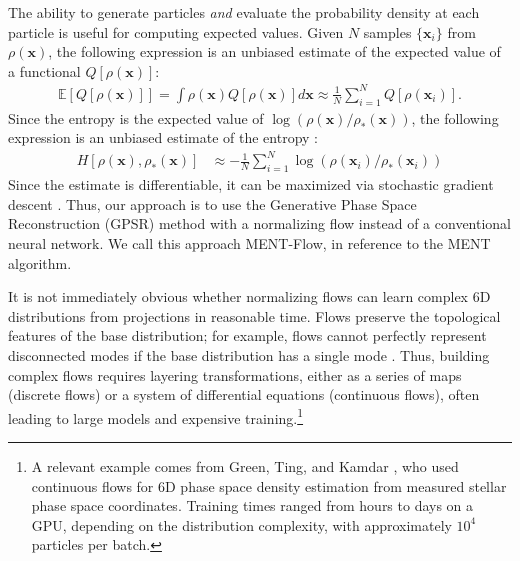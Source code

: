\documentclass[%
    reprint,
    twocolumn,
    nofootinbib,
    amsmath,
    amssymb,
    aps,
    prstab,
]{revtex4-2}
\newcommand{\vect}[1]{\boldsymbol{\mathbf{#1}}}
\begin{document}
The ability to generate particles \textit{and} evaluate the probability density at each particle is useful for computing expected values. Given $N$ samples $\{ \vect{x}_i \}$ from $\rho(\vect{x})$, the following expression is an unbiased estimate of the expected value of a functional $Q[\rho(\vect{x})]$:
%
\begin{equation} \label{eq:monte_carlo}
\begin{aligned}
    \mathbb{E} 
    \left[ Q[\rho(\vect{x})] \right]
    = \int \rho(\vect{x}) Q[\rho(\vect{x})] d\vect{x}
    \approx 
    \frac{1}{N} 
    \sum_{i=1}^{N}  Q[\rho(\vect{x}_i)].
\end{aligned}
\end{equation}
%
Since the entropy is the expected value of $\log ( \rho(\vect{x}) / \rho_*(\vect{x}))$, the following expression is an unbiased estimate of the entropy \cite{Loaiza_2016}:
%
\begin{equation} \label{eq:flow_entropy}
\begin{aligned}
    H[\rho(\vect{x}), \rho_*(\vect{x})]
    &\approx
    -\frac{1}{N} 
    \sum_{i=1}^{N} 
    \log ( \rho(\vect{x}_i) / \rho_*(\vect{x}_i) ) 
\end{aligned}
\end{equation}
%
Since the estimate is differentiable, it can be maximized via stochastic gradient descent \cite{Loaiza_2016}. Thus, our approach is to use the Generative Phase Space Reconstruction (GPSR) method \cite{Roussel_2023} with a normalizing flow instead of a conventional neural network. We call this approach MENT-Flow, in reference to the MENT algorithm.

It is not immediately obvious whether normalizing flows can learn complex 6D distributions from projections in reasonable time. Flows preserve the topological features of the base distribution; for example, flows cannot perfectly represent disconnected modes if the base distribution has a single mode \cite{Stimper_2022}. Thus, building complex flows requires layering transformations, either as a series of maps (discrete flows) or a system of differential equations (continuous flows), often leading to large models and expensive training.\footnote{A relevant example comes from Green, Ting, and Kamdar \cite{Green_2023}, who used continuous flows for 6D phase space density estimation from measured stellar phase space coordinates. Training times ranged from hours to days on a GPU, depending on the distribution complexity, with approximately $10^4$ particles per batch.} 
\end{document}
